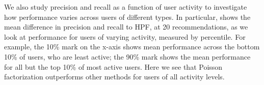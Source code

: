 We also study precision and recall as a function of user activity to
investigate how performance varies across users of different types. In
particular,  shows the mean
difference in precision and recall to HPF, at 20 recommendations, as
we look at performance for users of varying activity, measured by
percentile. For example, the 10\% mark on the x-axis shows mean
performance across the bottom 10\% of users, who are least active; the
90\% mark shows the mean performance for all but the top 10\% of most
active users. Here we see that Poisson factorization outperforms other
methods for users of all activity levels.







